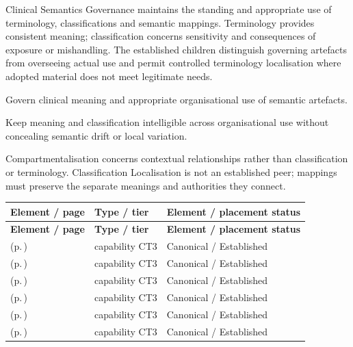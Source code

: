 Clinical Semantics Governance maintains the standing and appropriate use of terminology, classifications and semantic mappings. Terminology provides consistent meaning; classification concerns sensitivity and consequences of exposure or mishandling. The established children distinguish governing artefacts from overseeing actual use and permit controlled terminology localisation where adopted material does not meet legitimate needs.



Govern clinical meaning and appropriate organisational use of semantic artefacts.



Keep meaning and classification intelligible across organisational use without concealing semantic drift or local variation.



Compartmentalisation concerns contextual relationships rather than classification or terminology. Classification Localisation is not an established peer; mappings must preserve the separate meanings and authorities they connect.


\begingroup\small\setlength{\TableWidth}{\dimexpr\linewidth-6\tabcolsep-4\arrayrulewidth\relax}
\begin{longtable}{|>{\raggedright\arraybackslash}p{0.52\TableWidth}|>{\raggedright\arraybackslash}p{0.2\TableWidth}|>{\raggedright\arraybackslash}p{0.28\TableWidth}|}
\hline\rowcolor{TableHead}\textbf{Element / page} & \textbf{Type / tier} & \textbf{Element / placement status}\\\hline\endfirsthead
\hline\rowcolor{TableHead}\textbf{Element / page} & \textbf{Type / tier} & \textbf{Element / placement status}\\\hline\endhead
\hline\endfoot
\nameref{cap:bc-terminology-governance} (p.\,\pageref{cap:bc-terminology-governance}) & capability CT3 & Canonical / Established\\\hline
\nameref{cap:bc-terminology-utilisation-oversight} (p.\,\pageref{cap:bc-terminology-utilisation-oversight}) & capability CT3 & Canonical / Established\\\hline
\nameref{cap:bc-terminology-localisation} (p.\,\pageref{cap:bc-terminology-localisation}) & capability CT3 & Canonical / Established\\\hline
\nameref{cap:bc-classification-governance} (p.\,\pageref{cap:bc-classification-governance}) & capability CT3 & Canonical / Established\\\hline
\nameref{cap:bc-classification-utilisation-oversight} (p.\,\pageref{cap:bc-classification-utilisation-oversight}) & capability CT3 & Canonical / Established\\\hline
\nameref{cap:bc-semantic-mapping-governance} (p.\,\pageref{cap:bc-semantic-mapping-governance}) & capability CT3 & Canonical / Established\\\hline
\end{longtable}\endgroup

